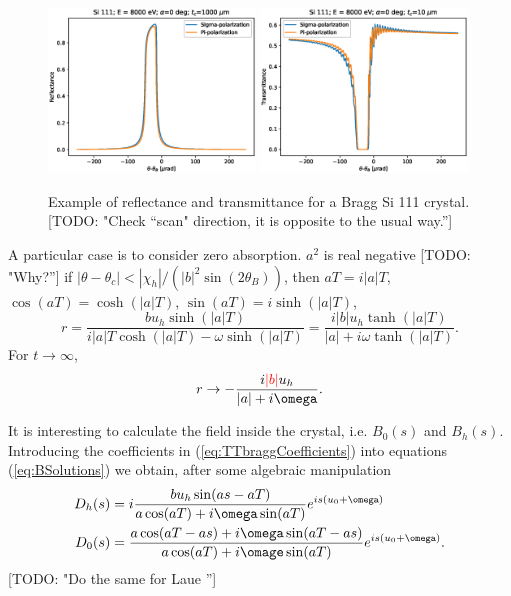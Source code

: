 \documentclass[preprint]{iucr}              %
\newcommand{\todo}[1]{{\color{red}[TODO: "#1'']}}
\newcommand{\inblue}[1]{{\color{blue}#1}}
\newcommand{\inred}[1]{{\color{red}#1}}
\begin{document}
\begin{figure}\label{fig:braggProfiles}
    \centering
    \includegraphics[width=0.49\textwidth]{figures/Bragg_1.eps}
    \includegraphics[width=0.49\textwidth]{figures/Bragg_2.eps}
    \caption{Example of reflectance and transmittance for a Bragg Si 111 crystal. \todo{Check ``scan" direction, it is opposite to the usual way.}}
\end{figure}


\inblue{A particular case is to consider zero absorption. 
$a^2$ is real negative \todo{Why?} if $|\theta-\theta_c|<|\chi_h|/(|b|^2 \sin(2 \theta_B))$, then $aT=i |a| T$, $\cos(a T)=\cosh(|a|T)$, $\sin(a T)=i \sinh(|a|T)$, 
\begin{equation}
    r = \frac{b u_h \sinh(|a|T)}{i |a|T \cosh(|a|T)- \omega
    \sinh(|a|T)}=
\frac{i |b| u_h \tanh(|a|T)}{|a|+ i \omega \tanh(|a|T)}.
\end{equation}
For $t \rightarrow \infty$, 
\begin{equation}
    r \rightarrow - \frac{i \inred{|b|} u_h}{|a|+ i \omega} .
\end{equation}
}

\inblue{
It is interesting to calculate the field inside the crystal, i.e. $B_0(s)$ and $B_h(s)$. Introducing the coefficients in (\ref{eq:TTbraggCoefficients}) into equations (\ref{eq:BSolutions}) we obtain, after some algebraic manipulation
\begin{subequations}\label{eq:bragginside}
\begin{align}
D_h(s)&=i \frac{b u_h \sin(as - aT)}{a \cos(aT) + i \omega \sin(aT)} e^{is(u_0+\omega)}\\
D_0(s)&= \frac{a \cos(aT-as) + i \omega \sin(aT-as)}{a \cos(aT) + i \omage \sin(aT)} e^{is(u_0+\omega)}.
\end{align}
\end{subequations}
}
\todo{Do the same for Laue }
\end{document}
